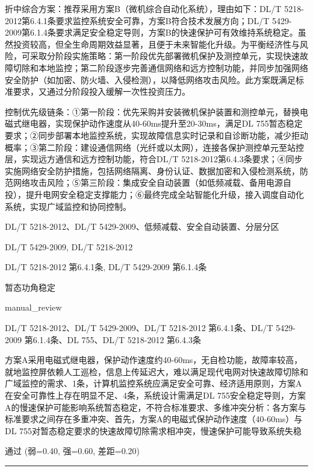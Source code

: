\documentclass[11pt,a4paper]{ctexart}
\begin{document}
\begin{description}[leftmargin=1.5em,style=nextline,font=\normalfont]
折中综合方案：推荐采用方案B（微机综合自动化系统），理由如下：DL/T 5218-2012第6.4.1条要求监控系统安全可靠，方案B符合技术发展方向；DL/T 5429-2009第6.1.4条要求满足安全稳定导则，方案B的快速保护可有效维持系统稳定。虽然投资较高，但全生命周期效益显著，且便于未来智能化升级。为平衡经济性与风险，可采取分阶段实施策略：第一阶段优先部署微机保护及测控单元，实现快速故障切除和本地监控；第二阶段逐步完善通信网络和远方控制功能，并同步加强网络安全防护（如加密、防火墙、入侵检测），以降低网络攻击风险。此方案既满足标准要求，又通过分阶段投入缓解一次性投资压力。

控制优先级链条：①第一阶段：优先采购并安装微机保护装置和测控单元，替换电磁式继电器，实现保护动作速度从40-60ms提升至20-30ms，满足DL 755暂态稳定要求；②同步部署本地监控系统，实现故障信息实时记录和自诊断功能，减少拒动概率；③第二阶段：建设通信网络（光纤或以太网），连接各保护测控单元至站控层，实现远方通信和远方控制功能，符合DL/T 5218-2012第6.4.3条要求；④同步实施网络安全防护措施，包括网络隔离、身份认证、数据加密和入侵检测系统，防范网络攻击风险；⑤第三阶段：集成安全自动装置（如低频减载、备用电源自投），提升电网安全稳定支撑能力；⑥最终完成全站智能化升级，接入调度自动化系统，实现广域监控和协同控制。
  \item[KW:] DL/T 5218-2012、DL/T 5429-2009、低频减载、安全自动装置、分层分区
  \item[标准:] DL/T 5429-2009, DL/T 5218-2012
  \item[条款溯源:] DL/T 5218-2012 第6.4.1条, DL/T 5429-2009 第6.1.4条
  \item[主题:] 暂态功角稳定
  \item[评分方式:] manual\_review
  \item[Rubric条款:] DL/T 5218-2012、DL/T 5429-2009、DL/T 5218-2012 第6.4.1条、DL/T 5429-2009 第6.1.4条、DL 755、DL/T 5218-2012 第6.4.3条
  \item[Rubric判据:] 方案A采用电磁式继电器，保护动作速度约40-60ms，无自检功能，故障率较高，就地监控屏依赖人工巡检，信息上传延迟大，难以满足现代电网对快速故障切除和广域监控的需求、1条，计算机监控系统应满足安全可靠、经济适用原则，方案A在安全可靠性上存在明显不足、4条，系统设计需满足DL 755安全稳定导则，方案A的慢速保护可能影响系统暂态稳定，不符合标准要求、多维冲突分析：各方案与标准要求之间存在多重冲突、首先，方案A的电磁式保护动作速度（40-60ms）与DL 755对暂态稳定要求的快速故障切除需求相冲突，慢速保护可能导致系统失稳
  \item[LJ判定:] 通过 (弱=0.40, 强=0.60, 差距=0.20)
\end{description}
\vspace{4pt}
\hrule
\vspace{6pt}
\end{document}
